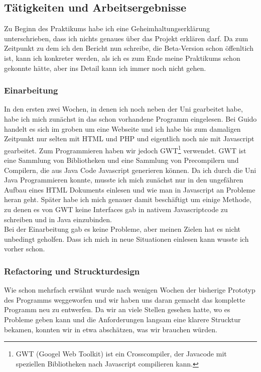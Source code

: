 \subsection{Tätigkeiten und Arbeitsergebnisse}

Zu Beginn des Praktikums habe ich eine Geheimhaltungserklärung unterschrieben, dass ich nichts genaues über das Projekt erklären darf. Da zum Zeitpunkt zu dem ich den Bericht nun schreibe, die Beta-Version schon öffenltich ist, kann ich konkreter werden, als ich es zum Ende meine Praktikums schon gekonnte hätte, aber ins Detail kann ich immer noch nicht gehen.

\subsubsection{Einarbeitung}

In den ersten zwei Wochen, in denen ich noch neben der Uni gearbeitet habe, habe ich mich zunächst in das schon vorhandene Programm eingelesen. Bei Guido handelt es sich im groben um eine Webseite und ich habe bis zum damaligen Zeitpunkt nur selten mit HTML und PHP und eigentlich noch nie mit Javascript gearbeitet. Zum Programmieren haben wir jedoch GWT\footnote{GWT (Googel Web Toolkit) ist ein Crosscompiler, der Javacode mit speziellen Bibliotheken nach Javascript compilieren kann.} verwendet. GWT ist eine Sammlung von Bibliotheken und eine Sammlung von Precompilern und Compilern, die aus Java Code Javascript generieren können. Da ich durch die Uni Java Programmieren konnte, musste ich mich zunächst nur in den ungefähren Aufbau eines HTML Dokuments einlesen und wie man in Javascript an Probleme heran geht. Später habe ich mich genauer damit beschäftigt um einige Methode, zu denen es von GWT keine Interfaces gab in nativem Javascriptcode zu schreiben und in Java einzubinden.\\

Bei der Einarbeitung gab es keine Probleme, aber meinen Zielen hat es nicht unbedingt geholfen. Dass ich mich in neue Situationen einlesen kann wusste ich vorher schon.

\subsubsection{Refactoring und Struckturdesign}

Wie schon mehrfach erwähnt wurde nach wenigen Wochen der bisherige Prototyp des Programms weggeworfen und wir haben uns daran gemacht das komplette Programm neu zu entwerfen. Da wir an viele Stellen gesehen hatte, wo es Probleme geben kann und die Anforderungen langsam eine klarere Strucktur bekamen, konnten wir in etwa abschätzen, was wir brauchen würden.\\

